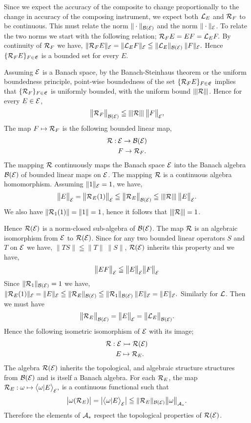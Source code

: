 \documentclass[11pt]{article}
\begin{document}
Since we expect the accuracy of the composite to change proportionally to the change in accuracy of the composing instrument, we expect both $\mathcal{L}_E$ and $\mathcal{R}_F$ to be continuous. This must relate the norm $\|\cdot\|_{\mathcal{B}(\mathcal{E})}$ and the norm $\|\cdot\|_{\mathcal{E}}$. To relate the two norms we start with the following relation; $\mathcal{R}_FE=EF=\mathcal{L}_E F.$ By continuity of $\mathcal{R}_F$ we have, $\| \mathcal{R}_F E\|_{\mathcal{E}} =\| \mathcal{L}_E F\|_{\mathcal{E}}\leqq \| \mathcal{L}_E \|_{\mathcal{B}(\mathcal{E})}\:\| F\|_{\mathcal{E}}.$ Hence $\{\mathcal{R}_F E\}_{F\in \mathfrak{E}}$ is a bounded set for every $E$. 

Assuming $\mathcal{E}$ is a Banach space, by the Banach-Steinhaus theorem or the uniform boundedness principle, point-wise boundedness of the set $\{\mathcal{R}_F E\}_{F\in \mathfrak{E}}$ implies that $\{\mathcal{R}_F\}_{F\in {\mathfrak{E}}}$ is uniformly bounded, with the uniform bound ${\left\vert\kern-0.125ex\left\vert\kern-0.125ex\left\vert \mathcal{R} \right\vert\kern-0.125ex\right\vert\kern-0.125ex\right\vert}$. Hence for every $E\in \mathcal{E}$,
$$\big\|\mathcal{R}_F\big\|_{\mathcal{B}(\mathcal{E})} \leqq {\left\vert\kern-0.125ex\left\vert\kern-0.125ex\left\vert \mathcal{R}\right\vert\kern-0.125ex\right\vert\kern-0.125ex\right\vert} \:\big\|F\big\|_{\mathcal{E}},$$
The map $F\mapsto \mathcal{R}_F$ is the following bounded linear map,
\begin{align*}
	\mathcal{R}:\:&\mathcal{E}\to \mathcal{B}(\mathcal{E})\\
	&F\to \mathcal{R}_F.
\end{align*}
The mapping $\mathcal{R}$ continuously maps the Banach space ${\mathcal{E}}$ into the Banach algebra $\mathcal{B}({\mathcal{E}})$ of bounded linear maps on $\mathcal{E}$. The mapping $\mathcal{R}$ is a continuous algebra homomorphism. Assuming $\|1\|_{\mathcal{E}}=1$, we have,
$$\big\|E\big\|_{\mathcal{E}}=\big\|\mathcal{R}_E(1)\big\|_{\mathcal{E}} \leqq \big\|\mathcal{R}_E\big\|_{\mathcal{B}(\mathcal{E})}\leqq {\left\vert\kern-0.125ex\left\vert\kern-0.125ex\left\vert \mathcal{R}\right\vert\kern-0.125ex\right\vert\kern-0.125ex\right\vert} \:\big\|E\big\|_{\mathcal{E}}.$$
We also have $\|\mathcal{R}_1 (1)\|=\|1\|=1$, hence it follows that ${\left\vert\kern-0.125ex\left\vert\kern-0.125ex\left\vert \mathcal{R} \right\vert\kern-0.125ex\right\vert\kern-0.125ex\right\vert} =1$.

Hence $\mathcal{R}(\mathcal{E})$ is a norm-closed sub-algebra of $\mathcal{B}({\mathcal{E}})$. The map $\mathcal{R}$ is an algebraic isomorphism from ${\mathcal{E}}$ to $\mathcal{R}({\mathcal{E}})$. Since for any two bounded linear operators $S$ and $T$ on ${\mathcal{E}}$ we have, $\|TS\| \leqq \|T\|\:\|S\|$, $\mathcal{R}({\mathcal{E}})$ inherits this property and we have,
$$\big\|EF\big\|_{\mathcal{E}}\leqq \big\|E\big\|_{\mathcal{E}}\big\|F\big\|_{\mathcal{E}}$$
Since $\|\mathcal{R}_1\|_{\mathcal{B}(\mathcal{E})}=1$ we have, $\|\mathcal{R}_E(1)\|_{\mathcal{E}} =\|E\|_{\mathcal{E}} \leqq \|\mathcal{R}_E\|_{\mathcal{B}(\mathcal{E})} \leqq \|\mathcal{R}_1\|_{\mathcal{B}(\mathcal{E})}\:\|E\|_{\mathcal{E}}=\|E\|_{\mathcal{E}}.$ Similarly for $\mathcal{L}$.  Then we must have
$$\big\|\mathcal{R}_E\big\|_{\mathcal{B}(\mathcal{E})}=\big\|E\big\|_{\mathcal{E}}=\big\|\mathcal{L}_E\big\|_{\mathcal{B}(\mathcal{E})}.$$
Hence the following isometric isomorphism of $\mathcal{E}$ with its image;
\begin{align*}
	\mathcal{R}:\mathcal{E}&\rightarrowtail \mathcal{R}(\mathcal{E})\\
E&\mapsto \mathcal{R}_E.
\end{align*}
The algebra $\mathcal{R}({\mathcal{E}})$ inherits the topological, and algebraic structure structures from $\mathcal{B}(\mathcal{E})$ and is itself a Banach algebra. For each $\mathcal{R}_E$, the map $\mathcal{R}_E:\omega\mapsto \big\langle \omega|E\big\rangle_{\mathcal{E}},$ is a continuous functional such that
$$\big|\omega(\mathcal{R}_E)\big|=\big|\big\langle \omega|E\big\rangle_{\mathcal{E}}\big|\leqq \|\mathcal{R}_E\|_{\mathcal{B}(\mathcal{E})}\big\|\omega\big\|_{\mathcal{A}_*}.$$
Therefore the elements of $\mathcal{A}_* $ respect the topological properties of $\mathcal{R}(\mathcal{E})$.
\end{document}
